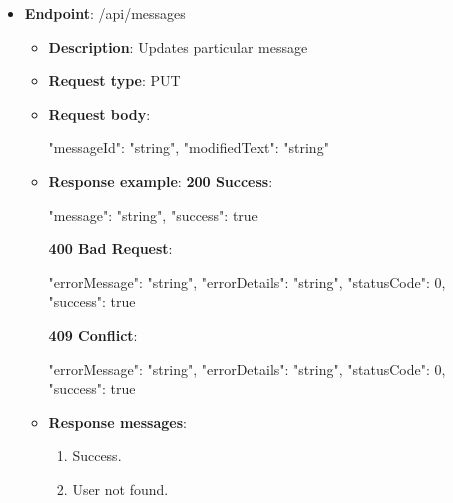 \begin{itemize}
    \item \textbf{Endpoint}: /api/messages
    \begin{itemize}
        \item \textbf{Description}: Updates particular message
        \item \textbf{Request type}: PUT
        \item \textbf{Request body}:
        \begin{spverbatim}
        {
            "messageId": "string",
            "modifiedText": "string"
        }
        \end{spverbatim}
        \item \textbf{Response example}:
        \textbf{200 Success}:
        \begin{spverbatim}
        {
            "message": "string",
            "success": true
        }
        \end{spverbatim}
        \textbf{400 Bad Request}:
        \begin{spverbatim}
        {
            "errorMessage": "string",
            "errorDetails": "string",
            "statusCode": 0,
            "success": true
        }
        \end{spverbatim}
        \textbf{409 Conflict}:
        \begin{spverbatim}
        {
            "errorMessage": "string",
            "errorDetails": "string",
            "statusCode": 0,
            "success": true
        }
        \end{spverbatim}
        \item \textbf{Response messages}:
        \begin{enumerate}
            \item Success.
            \item User not found.
        \end{enumerate}
    \end{itemize}


\end{itemize}
